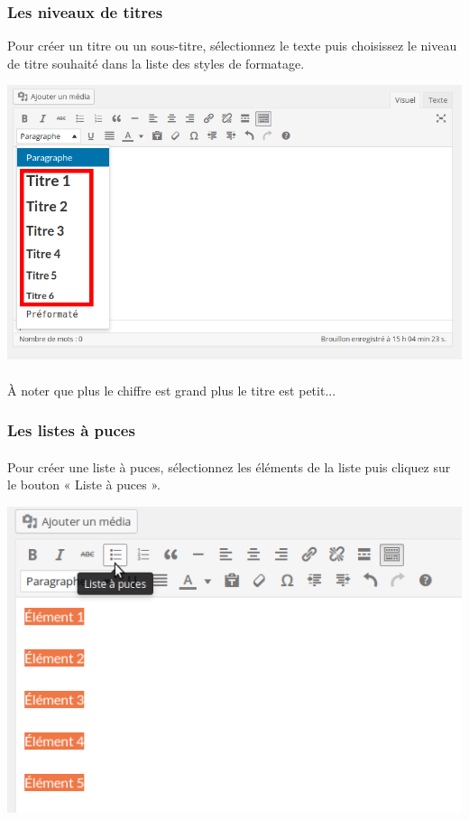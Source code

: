 \documentclass[10pt,a4paper]{article}
\begin{document}
\subsubsection{Les niveaux de titres}
Pour créer un titre ou un sous-titre, sélectionnez le texte puis choisissez le niveau de titre souhaité dans la liste des styles de formatage.
\begin{center}
\includegraphics[scale=0.35]{img/0072.png}
\end{center}
\paragraph{}À noter que plus le chiffre est grand plus le titre est petit...
\subsubsection{Les listes à puces}
\paragraph{}Pour créer une liste à puces, sélectionnez les éléments de la liste puis cliquez sur le bouton « Liste à puces ».
\begin{center}
\includegraphics[scale=0.35]{img/0073.png}
\end{center}
\end{document}
